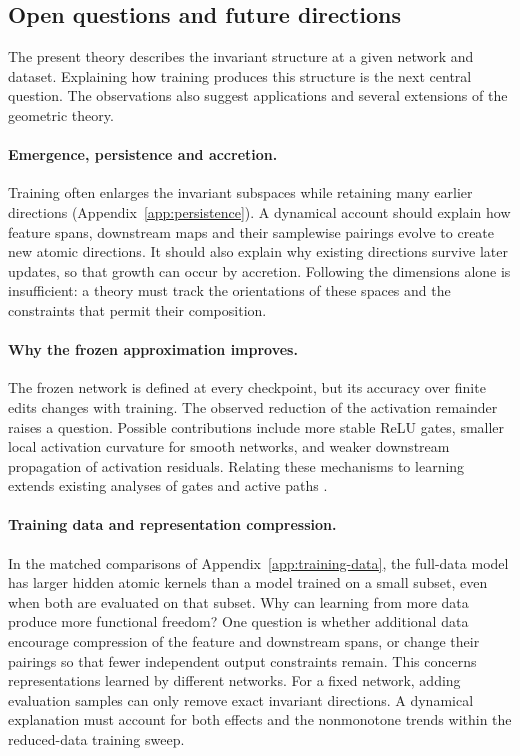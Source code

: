 \subsection{Open questions and future directions}
\label{app:future-work}
The present theory describes the invariant structure at a given network and dataset. Explaining how training produces this structure is the next central question. The observations also suggest applications and several extensions of the geometric theory.

\paragraph{Emergence, persistence and accretion.}
Training often enlarges the invariant subspaces while retaining many earlier directions (Appendix~\ref{app:persistence}). A dynamical account should explain how feature spans, downstream maps and their samplewise pairings evolve to create new atomic directions. It should also explain why existing directions survive later updates, so that growth can occur by accretion. Following the dimensions alone is insufficient: a theory must track the orientations of these spaces and the constraints that permit their composition.

\paragraph{Why the frozen approximation improves.}
The frozen network is defined at every checkpoint, but its accuracy over finite edits changes with training. The observed reduction of the activation remainder raises a question. Possible contributions include more stable ReLU gates, smaller local activation curvature for smooth networks, and weaker downstream propagation of activation residuals. Relating these mechanisms to learning extends existing analyses of gates and active paths \citep{lakshminarayanan2020paths}.

\paragraph{Training data and representation compression.}
In the matched comparisons of Appendix~\ref{app:training-data}, the full-data model has larger hidden atomic kernels than a model trained on a small subset, even when both are evaluated on that subset. Why can learning from more data produce more functional freedom? One question is whether additional data encourage compression of the feature and downstream spans, or change their pairings so that fewer independent output constraints remain. This concerns representations learned by different networks. For a fixed network, adding evaluation samples can only remove exact invariant directions. A dynamical explanation must account for both effects and the nonmonotone trends within the reduced-data training sweep.

